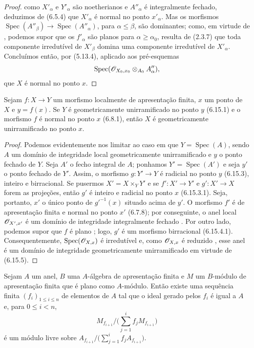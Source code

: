 \begin{proof}

como $X'_\alpha$ e $Y'_\alpha$ são
noetherianos e $A''_\alpha$ é
integralmente fechado, deduzimos
de (6.5.4) que $X'_\alpha$ é normal
no ponto $x'_\alpha$. Mas os morfismos
$\operatorname{Spec}(A''_\beta)\to
\operatorname{Spec}(A''_\alpha)$, para
$\alpha\leq\beta$, são dominantes;
como, em virtude de ,
podemos supor que os $f'_\alpha$
são planos para $\alpha\geq\alpha_0$,
resulta de (2.3.7) que toda componente
irredutível de $X'_\beta$ domina uma
componente irredutível de $X'_\alpha$.
Concluímos então, por (5.13.4), aplicado
aos pré-esquemas
\[
\operatorname{Spec}
(\mathscr{O}_{X_0,x_0}\otimes_{A_0}A''_\alpha),
\]
que $X$ é normal no ponto $x$.
\end{proof}

\begin{corollary}[11.3.14]
\label{IV.11.3.14}
Sejam $f:X\to Y$ um morfismo
localmente de apresentação finita,
$x$ um ponto de $X$ e $y=f(x)$.
Se $Y$ é geometricamente unirramificado
no ponto $y$ (6.15.1) e o morfismo
$f$ é normal no ponto $x$ (6.8.1),
então $X$ é geometricamente
unirramificado no ponto $x$.
\end{corollary}

\begin{proof}
Podemos evidentemente nos limitar ao
caso em que $Y=\operatorname{Spec}(A)$,
sendo $A$ um domínio de integridade local
geometricamente unirramificado e $y$
o ponto fechado de $Y$. Seja $A'$ o
fecho integral de $A$; ponhamos
$Y'=\operatorname{Spec}(A')$ e seja
$y'$ o ponto fechado de $Y'$. Assim,
o morfismo $g:Y'\to Y$ é radicial
no ponto $y$ (6.15.3), inteiro e
birracional. Se pusermos
$X'=X\times_Y Y'$ e se
$f':X'\to Y'$ e $g':X'\to X$
forem as projeções, então $g'$ é
inteiro e radicial no ponto $x$
(6.15.3.1). Seja, portanto, $x'$
o único ponto de $g'^{-1}(x)$
situado acima de $y'$. O morfismo
$f'$ é de apresentação finita e
normal no ponto $x'$ (6.7.8);
por conseguinte, o anel local
$\mathscr{O}_{X',x'}$ é um domínio de integridade
integralmente fechado
. Por outro lado,
podemos supor que $f$ é plano
; logo, $g'$ é um
morfismo birracional (6.15.4.1).
Consequentemente,
$\operatorname{Spec}(\mathscr{O}_{X,x})$
é irredutível e, como
$\mathscr{O}_{X,x}$ é reduzido
, esse anel é
um domínio de integridade geometricamente
unirramificado em virtude de
(6.15.5).
\end{proof}

\begin{proposition}[11.3.15]
\label{IV.11.3.15}
Sejam $A$ um anel, $B$ uma
$A$-álgebra de apresentação finita
e $M$ um $B$-módulo de apresentação
finita que é plano como $A$-módulo.
Então existe uma sequência finita
$(f_i)_{1\leq i\leq n}$ de elementos
de $A$ tal que o ideal gerado pelos
$f_i$ é igual a $A$ e, para
$0\leq i<n$,
\[
M_{f_{i+1}}\Big/
\Big(\sum_{j=1}^{i}f_jM_{f_{i+1}}\Big)
\]
é um módulo livre sobre
$A_{f_{i+1}}\big/
\big(\sum_{j=1}^{i}f_jA_{f_{i+1}}\big)$.
\end{proposition}


